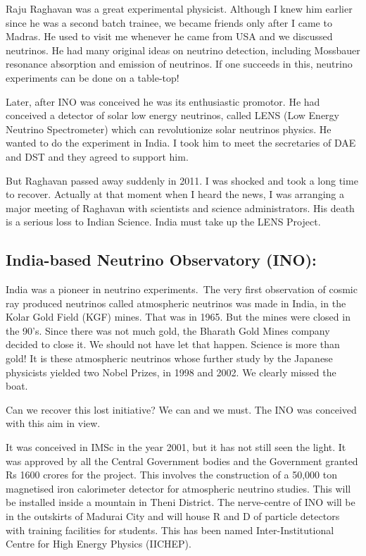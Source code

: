 Raju Raghavan was a great experimental physicist. Although I knew him 
earlier since he was a second batch trainee, we becam\-e friends only 
after I came to Madras. He used to visit me whenever he came from USA 
and we discussed neutrinos. He had many origina\-l ideas on neutrino 
detection, including Mossbauer resonance absorption and emission of 
neutrinos. If one succeeds in this, neutrino experiments can be done on 
a table-top!


Later, after INO was conceived he was its enthusiastic promotor. He had 
conceived a detector of solar low energy neutrinos, called LENS (Low 
Energy Neutrino Spectrometer) which can revolutionize solar neutrinos 
physics. He wanted to do the experi\-ment in India. I took him to meet the 
secretaries of DAE and DST and they agreed to support him.


But Raghavan passed away suddenly in 2011. I was shocked and took a long 
time to recover. Actually at that moment when I heard the news, I was 
arranging a major meeting of Raghavan with scientists and science 
administrators. His death is a serious loss to Indian Science. India 
must take up the LENS Project.


\subsection*{India-based Neutrino Observatory (INO):}

India was a pioneer in neutrino experiments.\ The very first observation 
of cosmic ray produced neutrinos called atmospheric neutrinos was made 
in India, in the Kolar Gold Field (KGF) mines. That was in 1965. But the 
mines were closed in the 90's. Since there was not much gold, the 
Bharath Gold Mines company decided to close it. We should not have let 
that happen. Science is more than gold! It is these atmospheric 
neutrinos whose further study by the Japanese physicists yielded two 
Nobel Prizes, in 1998 and 2002. We clearly missed the boat.

Can we recover this lost initiative? We can and we must. The INO was 
conceived with this aim in view.

It was conceived in IMSc in the year 2001, but it has not still seen the 
light. It was approved by all the Central Government bodies and the 
Government granted Rs 1600 crores for the pro\-ject. This involves the 
construction of a 50,000 ton magnetised iron calorimeter detector for 
atmospheric neutrino studies. This will be installed inside a mountain 
in Theni District. The nerve-centre of INO will be in the outskirts of 
Madurai City and will house R and D of particle detectors with training 
facilities for students. This has been named Inter-Institutional Centre 
for High Energy Physics (IICHEP).

